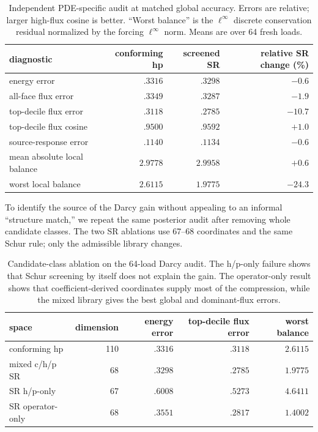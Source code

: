 \documentclass[11pt]{article}
\numberwithin{algorithm}{section}
\theoremstyle{definition}\newtheorem{definition}[theorem]{Definition}
\theoremstyle{remark}\newtheorem{remark}[theorem]{Remark}
\begin{document}
\begin{table}[H]
\centering
\caption{Independent PDE-specific audit at matched global accuracy.  Errors
are relative; larger high-flux cosine is better.  ``Worst balance'' is the
$\ell^\infty$ discrete conservation residual normalized by the forcing
$\ell^\infty$ norm.  Means are over 64 fresh loads.}
\label{tab:pde-quality}
\begin{tabular}{lrrr}
\toprule
diagnostic & conforming hp & screened SR & relative SR change (\%)\\
\midrule
energy error & $.3316$ & $.3298$ & $-0.6$\\
all-face flux error & $.3349$ & $.3287$ & $-1.9$\\
top-decile flux error & $.3118$ & $.2785$ & $-10.7$\\
top-decile flux cosine & $.9500$ & $.9592$ & $+1.0$\\
source-response error & $.1140$ & $.1134$ & $-0.6$\\
mean absolute local balance & $2.9778$ & $2.9958$ & $+0.6$\\
worst local balance & $2.6115$ & $1.9775$ & $-24.3$\\
\bottomrule
\end{tabular}
\end{table}

To identify the source of the Darcy gain without appealing to an informal
``structure match,'' we repeat the same posterior audit after removing whole
candidate classes.  The two SR ablations use 67--68 coordinates and the same
Schur rule; only the admissible library changes.

\begin{table}[H]
\centering
\caption{Candidate-class ablation on the 64-load Darcy audit.  The h/p-only
failure shows that Schur screening by itself does not explain the gain.  The
operator-only result shows that coefficient-derived coordinates supply most
of the compression, while the mixed library gives the best global and
dominant-flux errors.}
\label{tab:darcy-mechanism-ablation}
\begin{tabular}{lrrrr}
\toprule
space & dimension & energy error & top-decile flux error & worst balance\\
\midrule
conforming hp & 110 & $.3316$ & $.3118$ & $2.6115$\\
mixed c/h/p SR & 68 & $.3298$ & $.2785$ & $1.9775$\\
SR h/p-only & 67 & $.6008$ & $.5273$ & $4.6411$\\
SR operator-only & 68 & $.3551$ & $.2817$ & $1.4002$\\
\bottomrule
\end{tabular}
\end{table}
\end{document}

